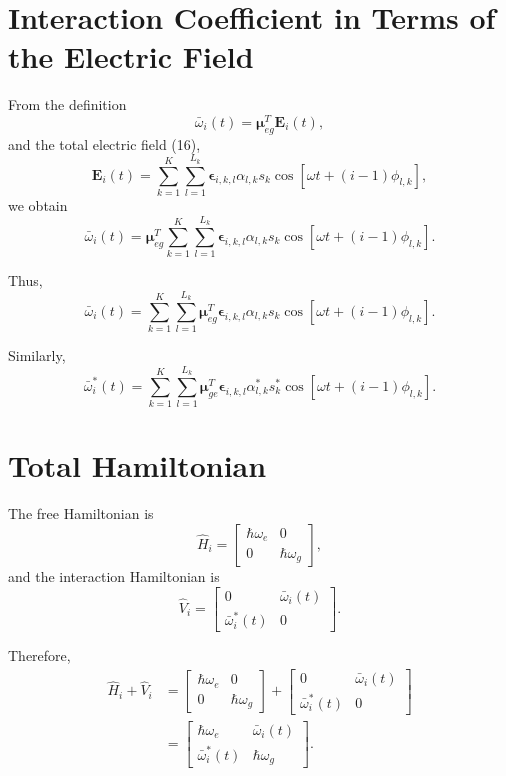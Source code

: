 \documentclass[12pt,a4paper]{article}
\begin{document}
\section{Interaction Coefficient in Terms of the Electric Field}

From the definition
\[
\bar{\omega}_i(t)
=
\boldsymbol{\mu}_{eg}^{T}\mathbf E_i(t),
\]
and the total electric field (16),
\[
\mathbf E_i(t)
=
\sum_{k=1}^{K}
\sum_{l=1}^{L_k}
\boldsymbol{\epsilon}_{i,k,l}
\alpha_{l,k}s_k
\cos
\left[
\omega t+(i-1)\phi_{l,k}
\right],
\]
we obtain
\[
\bar{\omega}_i(t)
=
\boldsymbol{\mu}_{eg}^{T}
\sum_{k=1}^{K}
\sum_{l=1}^{L_k}
\boldsymbol{\epsilon}_{i,k,l}
\alpha_{l,k}s_k
\cos
\left[
\omega t+(i-1)\phi_{l,k}
\right].
\]

Thus,
\begin{equation}
\boxed{
\bar{\omega}_i(t)
=
\sum_{k=1}^{K}
\sum_{l=1}^{L_k}
\boldsymbol{\mu}_{eg}^{T}
\boldsymbol{\epsilon}_{i,k,l}
\alpha_{l,k}s_k
\cos
\left[
\omega t+(i-1)\phi_{l,k}
\right].
}
\tag{26}
\end{equation}

Similarly,
\[
\bar{\omega}_i^{*}(t)
=
\sum_{k=1}^{K}
\sum_{l=1}^{L_k}
\boldsymbol{\mu}_{ge}^{T}
\boldsymbol{\epsilon}_{i,k,l}
\alpha_{l,k}^{*}s_k^{*}
\cos
\left[
\omega t+(i-1)\phi_{l,k}
\right].
\]

\section{Total Hamiltonian}

The free Hamiltonian is
\[
\hat H_i
=
\begin{bmatrix}
\hbar\omega_e&0\\
0&\hbar\omega_g
\end{bmatrix},
\]
and the interaction Hamiltonian is
\[
\hat V_i
=
\begin{bmatrix}
0&\bar{\omega}_i(t)\\
\bar{\omega}_i^{*}(t)&0
\end{bmatrix}.
\]

Therefore,
\[
\begin{aligned}
\hat H_i+\hat V_i
&=
\begin{bmatrix}
\hbar\omega_e&0\\
0&\hbar\omega_g
\end{bmatrix}
+
\begin{bmatrix}
0&\bar{\omega}_i(t)\\
\bar{\omega}_i^{*}(t)&0
\end{bmatrix}\\
&=
\begin{bmatrix}
\hbar\omega_e&\bar{\omega}_i(t)\\
\bar{\omega}_i^{*}(t)&\hbar\omega_g
\end{bmatrix}.
\end{aligned}
\]
\end{document}
